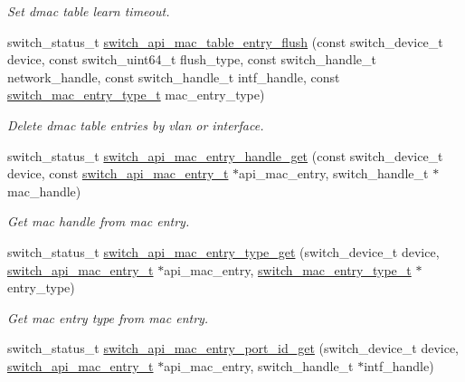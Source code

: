 \begin{DoxyCompactItemize}
\begin{DoxyCompactList}\small\item\em Set dmac table learn timeout. \end{DoxyCompactList}\item 
switch\+\_\+status\+\_\+t \hyperlink{group__L2_ga7fc723b28885ca5a0c5f68e23647fe38}{switch\+\_\+api\+\_\+mac\+\_\+table\+\_\+entry\+\_\+flush} (const switch\+\_\+device\+\_\+t device, const switch\+\_\+uint64\+\_\+t flush\+\_\+type, const switch\+\_\+handle\+\_\+t network\+\_\+handle, const switch\+\_\+handle\+\_\+t intf\+\_\+handle, const \hyperlink{group__L2_gae4c546ddb72c6390d040cfa329cfe024}{switch\+\_\+mac\+\_\+entry\+\_\+type\+\_\+t} mac\+\_\+entry\+\_\+type)
\begin{DoxyCompactList}\small\item\em Delete dmac table entries by vlan or interface. \end{DoxyCompactList}\item 
switch\+\_\+status\+\_\+t \hyperlink{group__L2_ga1d47a444c79287aeaa406be59dcf8c60}{switch\+\_\+api\+\_\+mac\+\_\+entry\+\_\+handle\+\_\+get} (const switch\+\_\+device\+\_\+t device, const \hyperlink{group__L2_ga2fde8bafec6b710770603b5cde2f94af}{switch\+\_\+api\+\_\+mac\+\_\+entry\+\_\+t} $\ast$api\+\_\+mac\+\_\+entry, switch\+\_\+handle\+\_\+t $\ast$mac\+\_\+handle)
\begin{DoxyCompactList}\small\item\em Get mac handle from mac entry. \end{DoxyCompactList}\item 
switch\+\_\+status\+\_\+t \hyperlink{group__L2_gac27d09a5dce49ba7b3e5872b9711248f}{switch\+\_\+api\+\_\+mac\+\_\+entry\+\_\+type\+\_\+get} (switch\+\_\+device\+\_\+t device, \hyperlink{group__L2_ga2fde8bafec6b710770603b5cde2f94af}{switch\+\_\+api\+\_\+mac\+\_\+entry\+\_\+t} $\ast$api\+\_\+mac\+\_\+entry, \hyperlink{group__L2_gae4c546ddb72c6390d040cfa329cfe024}{switch\+\_\+mac\+\_\+entry\+\_\+type\+\_\+t} $\ast$entry\+\_\+type)
\begin{DoxyCompactList}\small\item\em Get mac entry type from mac entry. \end{DoxyCompactList}\item 
switch\+\_\+status\+\_\+t \hyperlink{group__L2_ga340aa8e6a40d82c896b47f063d1fda1f}{switch\+\_\+api\+\_\+mac\+\_\+entry\+\_\+port\+\_\+id\+\_\+get} (switch\+\_\+device\+\_\+t device, \hyperlink{group__L2_ga2fde8bafec6b710770603b5cde2f94af}{switch\+\_\+api\+\_\+mac\+\_\+entry\+\_\+t} $\ast$api\+\_\+mac\+\_\+entry, switch\+\_\+handle\+\_\+t $\ast$intf\+\_\+handle)

\end{DoxyCompactItemize}
